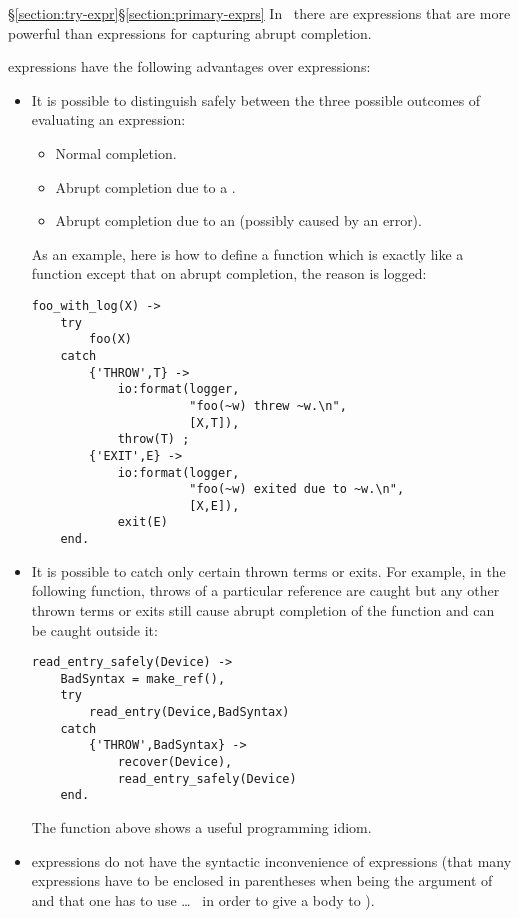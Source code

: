 \begin{Lentry}
\item[\ifStd\S\ref{section:try-expr}\fi\ifOld\S\ref{section:primary-exprs}\fi]
In \StdErlang\ there are  expressions that are more powerful than
 expressions for capturing abrupt completion.

 expressions have the following advantages over  expressions:
\begin{itemize}
\item It is possible to distinguish safely between the three possible
outcomes of evaluating an expression:
\begin{itemize}
\item Normal completion.
\item Abrupt completion due to a .
\item Abrupt completion due to an  (possibly caused by an error).
\end{itemize}
As an example, here is how to define a function  which
is exactly like a function  except that on abrupt completion,
the reason is logged:
\begin{verbatim}
foo_with_log(X) ->
    try
        foo(X)
    catch
        {'THROW',T} ->
            io:format(logger,
                      "foo(~w) threw ~w.\n",
                      [X,T]),
            throw(T) ;
        {'EXIT',E} ->
            io:format(logger,
                      "foo(~w) exited due to ~w.\n",
                      [X,E]),
            exit(E)
    end.
\end{verbatim}
\item It is possible to catch only certain thrown terms or exits.  For example,
in the following function, throws of a particular reference  are
caught but any other thrown terms or exits still cause abrupt completion of the
function and can be caught outside it:
\begin{verbatim}
read_entry_safely(Device) ->
    BadSyntax = make_ref(),
    try
        read_entry(Device,BadSyntax)
    catch
        {'THROW',BadSyntax} ->
            recover(Device),
            read_entry_safely(Device)
    end.
\end{verbatim}
The function above shows a useful programming idiom.
\item {} expressions do not have the syntactic inconvenience of 
expressions (that many expressions have to be enclosed in parentheses when
being the argument of  and that one has to use  \ldots\ 
in order to give a body to ).
\end{itemize}


\end{Lentry}
